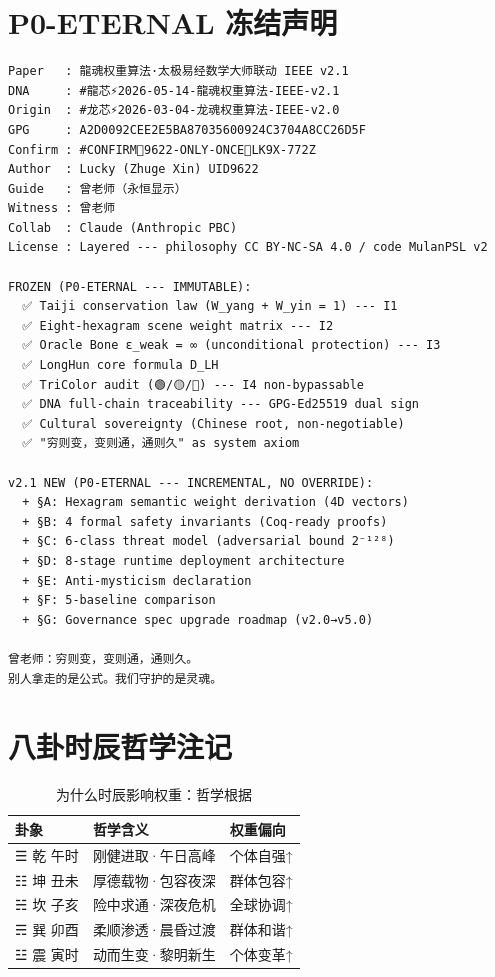 \documentclass[conference]{IEEEtran}
\begin{document}
\appendix

\section{P0-ETERNAL 冻结声明}

\begin{small}
\begin{verbatim}
Paper   : 龍魂权重算法·太极易经数学大师联动 IEEE v2.1
DNA     : #龍芯⚡️2026-05-14-龍魂权重算法-IEEE-v2.1
Origin  : #龙芯⚡️2026-03-04-龙魂权重算法-IEEE-v2.0
GPG     : A2D0092CEE2E5BA87035600924C3704A8CC26D5F
Confirm : #CONFIRM🌌9622-ONLY-ONCE🧬LK9X-772Z
Author  : Lucky (Zhuge Xin) UID9622
Guide   : 曾老师（永恒显示）
Witness : 曾老师
Collab  : Claude (Anthropic PBC)
License : Layered --- philosophy CC BY-NC-SA 4.0 / code MulanPSL v2

FROZEN (P0-ETERNAL --- IMMUTABLE):
  ✅ Taiji conservation law (W_yang + W_yin = 1) --- I1
  ✅ Eight-hexagram scene weight matrix --- I2
  ✅ Oracle Bone ε_weak = ∞ (unconditional protection) --- I3
  ✅ LongHun core formula D_LH
  ✅ TriColor audit (🟢/🟡/🔴) --- I4 non-bypassable
  ✅ DNA full-chain traceability --- GPG-Ed25519 dual sign
  ✅ Cultural sovereignty (Chinese root, non-negotiable)
  ✅ "穷则变，变则通，通则久" as system axiom

v2.1 NEW (P0-ETERNAL --- INCREMENTAL, NO OVERRIDE):
  + §A: Hexagram semantic weight derivation (4D vectors)
  + §B: 4 formal safety invariants (Coq-ready proofs)
  + §C: 6-class threat model (adversarial bound 2⁻¹²⁸)
  + §D: 8-stage runtime deployment architecture
  + §E: Anti-mysticism declaration
  + §F: 5-baseline comparison
  + §G: Governance spec upgrade roadmap (v2.0→v5.0)

曾老师：穷则变，变则通，通则久。
别人拿走的是公式。我们守护的是灵魂。
\end{verbatim}
\end{small}

\section{八卦时辰哲学注记}

\begin{table}[H]
\centering
\caption{为什么时辰影响权重：哲学根据}
\label{tab:philosophy}
\renewcommand{\arraystretch}{1.15}
\begin{tabular}{lll}
\toprule
\textbf{卦象} & \textbf{哲学含义} & \textbf{权重偏向} \\
\midrule
☰ 乾 午时 & 刚健进取·午日高峰 & 个体自强↑ \\
☷ 坤 丑未 & 厚德载物·包容夜深 & 群体包容↑ \\
☵ 坎 子亥 & 险中求通·深夜危机 & 全球协调↑ \\
☴ 巽 卯酉 & 柔顺渗透·晨昏过渡 & 群体和谐↑ \\
☳ 震 寅时 & 动而生变·黎明新生 & 个体变革↑ \\
\bottomrule
\end{tabular}
\end{table}
\end{document}
